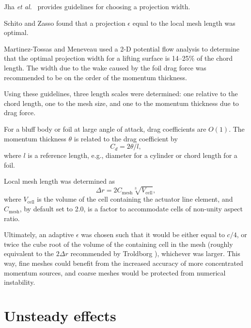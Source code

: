 Jha \emph{et al.}~\cite{Jha2014} provides guidelines for choosing a projection
width.

Schito and Zasso \cite{Schito2014} found that a projection $\epsilon$ equal to
the local mesh length was optimal.

Martinez-Tossas and Meneveau \cite{Martinez-Tossas2015b} used a 2-D potential
flow analysis to determine that the optimal projection width for a lifting
surface is 14--25\% of the chord length. The width due to the wake caused by the
foil drag force was recommended to be on the order of the momentum thickness.

Using these guidelines, three length scales were determined: one relative to the
chord length, one to the mesh size, and one to the momentum thickness due to
drag force.

For a bluff body or foil at large angle of attack, drag coefficients are $O(1)$.
The momentum thickness $\theta$ is related to the drag coefficient by
\cite{TennekesAndLumley}
\begin{equation}
    C_d = 2 \theta / l,
    \label{eq:mom-thickness}
\end{equation}
where $l$ is a reference length, e.g., diameter for a cylinder or chord length
for a foil.

Local mesh length was determined as 
\begin{equation}
    \Delta r = 2C_\mathrm{mesh} \sqrt[3]{V_\mathrm{cell}},
\end{equation}
where $V_\mathrm{cell}$ is the volume of the cell containing the actuator line
element, and $C_\mathrm{mesh}$, by default set to 2.0, is a factor to
accommodate cells of non-unity aspect ratio.

Ultimately, an adaptive $\epsilon$ was chosen such that it would be either equal
to $c/4$, or twice the cube root of the volume of the containing cell in the
mesh (roughly equivalent to the $2\Delta r$ recommended by Troldborg
\cite{Troldborg2008}), whichever was larger. This way, fine meshes could benefit
from the increased accuracy of more concentrated momentum sources, and coarse
meshes would be protected from numerical instability.



\section{Unsteady effects}


